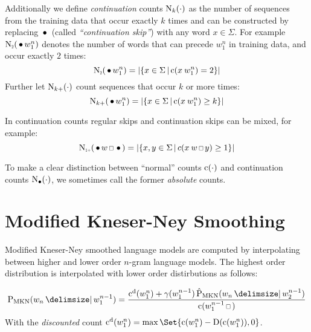 
Additionally we define \emph{continuation} counts $\operatorname{N}_k(\cdot)$ as
the number of sequences from the training data that occur exactly $k$ times and
can be constructed by replacing $\,\bullet\,$ (called \emph{``continuation skip''})
with any word $x \in \Sigma$.
For example $\ContCountII(\WSkp w_1^n)$ denotes the number of words that can
precede $w_1^n$ in training data, and occur exactly $2$ times:
\begin{equation}
  \ContCountII(\WSkp w_1^n) =
    \Cardinality{\left\{ x \in \Sigma \,\middle|\, \Count(x \: w_1^n) = 2 \right\}}
\end{equation}
Further let $\operatorname{N}_{k+}(\cdot)$ count sequences that occur $k$ or more
times:
\begin{equation}
  \operatorname{N}_{k+}(\,\bullet\, w_1^n) =
    \left|\left\{ x \in \Sigma \,\middle|\, \operatorname{c}(x \: w_1^n) \geq k \right\}\right|
\end{equation}

In continuation counts regular skips and continuation skips can be mixed, for
example:
\begin{equation}
  \ContCountIp(\WSkp w \Skp \WSkp) =
    \Cardinality{\left\{ x, y \in \Sigma \,\middle|\, c(x \: w \Skp y) \geq 1 \right\}}
\end{equation}

To make a clear distinction between ``normal'' counts $\operatorname{c}(\cdot)$ and
continuation counts $\operatorname{N}_{\bullet}(\cdot)$, we
sometimes call the former \emph{absolute} counts.


\section{Modified Kneser-Ney Smoothing}
\label{sec:review-lm-mkn}

\begin{draft}
Modified Kneser-Ney smoothed language models are computed by interpolating
between higher and lower order $n$-gram language models.
The highest order distribution is interpolated with lower order distirbutions
as follows:
\end{draft}
\begin{equation}
  \label{eq:mkn-high}
  \ProbMKN{w_n}{w_1^{n-1}} =
    \frac{\DiscountedCount(w_1^n) + \gamma(w_1^{n-1}) \ProbMKN*{w_n}{w_2^{n-1}}}
         {\Count(w_1^{n-1} \Skp)} \\
\end{equation}
With the \emph{discounted} count
${\DiscountedCount(w_1^n) = \max\Set{\Count(w_1^n) - \Discount(\Count(w_1^n)), 0}}$.

